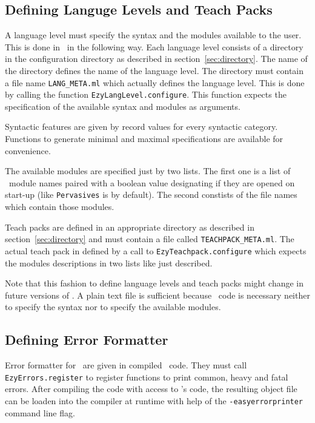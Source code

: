 \subsection{Defining Languge Levels and Teach Packs}
\label{sec:definelanglevels}

A language level must specify the syntax and the modules available to the user.
This is done in \easyocaml\ in the following way. Each language level consists
of a directory in the configuration directory as described in
section~\ref{sec:directory}. The name of the directory defines
the name of the language level. The directory must contain a file name
\texttt{LANG\_META.ml} which actually defines the language level. This is done
by calling the function \texttt{EzyLangLevel.configure}. This function expects
the specification of the available syntax and modules as arguments.

Syntactic features are given by record values for every syntactic category.
Functions to generate minimal and maximal specifications are available for
convenience.

The available modules are specified just by two lists.
The first one is a list of \ocaml\ module names paired with a boolean value
designating if they are opened on start-up (like \texttt{Pervasives} is by
default).
The second constists of the file names which contain those modules.

Teach packs are defined in an appropriate directory as described in
section~\ref{sec:directory} and must contain a file called
\texttt{TEACHPACK\_META.ml}. The actual teach pack in defined by a call to
\texttt{EzyTeachpack.configure} which expects the modules descriptions in two
lists like just described.
 
Note that this fashion to define language levels and teach packs might change in
future versions of \easyocaml.  A plain text file is sufficient because \ocaml\
code is necessary neither to specify the syntax nor to specify the available
modules.

\subsection{Defining Error Formatter}
\label{sec:errorfmt}

Error formatter for \easyocaml\ are given in compiled \ocaml\ code. They must
call \texttt{EzyErrors.register} to register functions to print common, heavy
and fatal errors. After compiling the code with access to \easyocaml's code,
the resulting object file can be loaden into the compiler at runtime with help
of the \texttt{-easyerrorprinter} command line flag.

